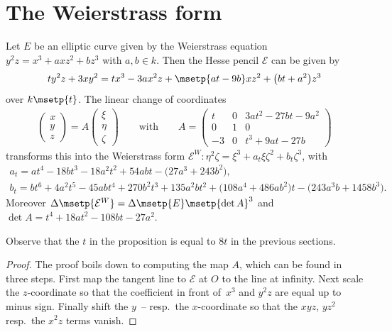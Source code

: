 \section{The Weierstrass form}\label{hpga:sec:wf}

\begin{Proposition}\label{prop7}Let $E$ be an elliptic curve given by the Weierstrass equation $y^2z=x^3+axz^2+bz^3$ with $a,b\in k$. Then the Hesse pencil $\mathcal{E}$ can be given by
\begin{gather*}
ty^2z+3xy^2=tx^3-3ax^2z+\msetp{at-9b}xz^2+ \big(bt+a^2\big)z^3
\end{gather*}
over $k\msetp{t}$. The linear change of coordinates
\begin{gather*}
\begin{pmatrix}
x \\ y \\ z
\end{pmatrix}
=A\begin{pmatrix}
\xi \\ \eta \\ \zeta
\end{pmatrix}
\qquad\text{with}\qquad
A=\begin{pmatrix}
t & 0 & 3at^2-27bt-9a^2 \\
0 & 1 & 0 \\
-3 & 0 & t^3+9at-27b
\end{pmatrix}
\end{gather*}
transforms this into the Weierstrass form $\mathcal{E}^W\colon \eta^2\zeta=\xi^3+a_t \xi\zeta^2+b_t\zeta^3$, with
\begin{gather*}
a_t = at^4-18bt^3-18a^2t^2+54abt-\big(27a^3+243b^2\big), \\
b_t = bt^6+4a^2t^5-45abt^4+270b^2t^3+135a^2bt^2 +\big(108a^4+486ab^2\big)t-\big(243a^3b+1458b^3\big).
\end{gather*}
Moreover $\Delta\msetp{\mathcal{E}^W}=\Delta\msetp{E}\msetp{\det A}^3$ and $\det A=t^4+18at^2-108bt-27a^2$.
\end{Proposition}

Observe that the $t$ in the proposition is equal to $8t$ in the previous sections.

\begin{proof}The proof boils down to computing the map $A$, which can be found in three steps. First map the tangent line to $\mathcal{E}$ at $O$ to the line at infinity. Next scale the $z$-coordinate so that the coefficient in front of~$x^3$ and $y^2z$ are equal up to minus sign. Finally shift the $y$~-- resp.\ the $x$-coordinate so that the $xyz$, $yz^2$ resp.\ the $x^2z$ terms vanish.
\end{proof}

